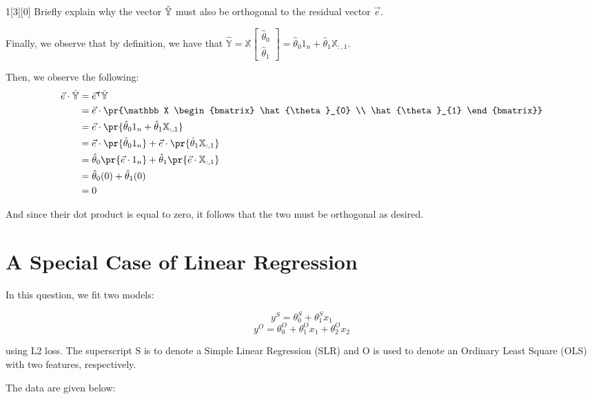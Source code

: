\documentclass{article}
\begin{document}
\begin{dshw}{1}[3][0]
	Briefly explain why the vector $\hat{\Bbb{Y}}$ must also be orthogonal to the residual vector $\vec{e}$. 
\end{dshw}
\begin{solution}
	Finally, we observe that by definition, we have that $\hat{\mathbb Y} = \mathbb X \begin{bmatrix}
		\hat{\theta}_{0} \\ \hat{\theta}_{1}
	\end{bmatrix} = \hat{\theta}_{0} 1_{n} + \hat{\theta}_{1} \mathbb {X}_{:,1}$.

	Then, we observe the following:
	\begin{align*}
		\vec e \cdot \hat{\mathbb Y} &= \vec{e}^{\intercal} \hat{\mathbb Y} \\
		&= \vec e \cdot \pr{\mathbb X \begin{bmatrix}
				\hat{\theta}_{0} \\ \hat{\theta}_{1}
		\end{bmatrix}} \\
	&= \vec{e} \cdot \pr{\hat{\theta}_{0} 1_{n} + \hat{\theta}_{1} \mathbb X_{:, 1}} \\
	&= \vec{e} \cdot \pr{\hat\theta_0 1_{n}} + \vec e \cdot \pr{\hat\theta_1 \mathbb X_{:, 1}} \\
	&= \hat\theta_0 \pr{\vec e \cdot 1_{n}} + \hat\theta_1 \pr{\vec e \cdot \mathbb X_{:,1}} \\
	&= \hat\theta_0 (0) + \hat\theta_1 (0) \\
	&= 0
	\end{align*}

	And since their dot product is equal to zero, it follows that the two must be orthogonal as desired.
\end{solution}

\newpage

\section{A Special Case of Linear Regression}
In this question, we fit two models:

$$y^{S} = \theta_0^{S} + \theta_1^{S} x_1$$
$$y^{O} = \theta_0^{O} + \theta_1^{O} x_1 +  \theta_2^{O} x_2$$

using L2 loss. The superscript S is to denote a Simple Linear Regression (SLR) and O is used to denote an Ordinary Least Square (OLS) with two features, respectively. 

The data are given below:
\end{document}

